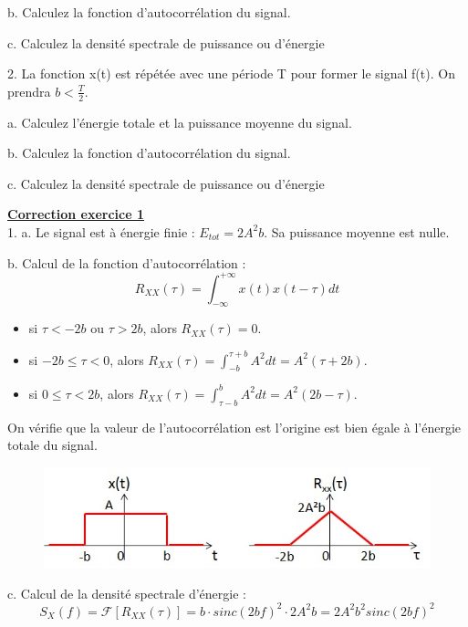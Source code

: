 \documentclass[11pt]{report}
\begin{document}
		b. Calculez la fonction d'autocorrélation du signal.
		
		c. Calculez la densité spectrale de puissance ou d'énergie
		
		\vspace{0.5\baselineskip}
	
	2. La fonction x(t) est répétée avec une période T pour former le signal f(t). On prendra $b<\frac{T}{2}$.
	
		a. Calculez l'énergie totale et la puissance moyenne du signal.
		
		b. Calculez la fonction d'autocorrélation du signal.
		
		c. Calculez la densité spectrale de puissance ou d'énergie
	
	\vspace{1\baselineskip}
	
	\textbf{\underline{Correction exercice 1}}\\
	
	1. a. Le signal est à énergie finie : $E_{tot} = 2A^{2}b$. Sa puissance moyenne est nulle.
	
	b. Calcul de la fonction d'autocorrélation :
	\begin{equation*}
	R_{XX}(\tau)=\int_{-\infty}^{+\infty}x(t)x(t-\tau)dt
	\end{equation*}
	\begin{itemize}
		\item si $\tau < -2b$ ou $\tau > 2b$, alors $R_{XX}(\tau)=0$.
		\item si $-2b \leq \tau < 0$, alors $R_{XX}(\tau)=\int_{-b}^{\tau +b}A^{2}dt=A^{2}(\tau+2b)$.
		\item si $0 \leq \tau < 2b$, alors $R_{XX}(\tau)=\int_{\tau-b}^{ b}A^{2}dt=A^{2}(2b-\tau)$. 
	\end{itemize}
	On vérifie que la valeur de l'autocorrélation est l'origine est bien égale à l'énergie totale du signal.

	\begin{figure}[h!]
		\centering
		\includegraphics[scale=0.6]{images/Exo_8_1_1.jpg} 
	\end{figure}

	c. Calcul de la densité spectrale d'énergie :
	\begin{equation*}
	S_{X}(f)=\mathcal{F}[R_{XX}(\tau)]=b\cdot sinc(2bf)^{2}\cdot 2A^{2}b=2A^{2}b^{2}sinc(2bf)^{2}	
	\end{equation*}
\end{document}

